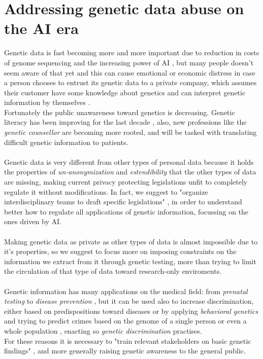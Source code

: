 \documentclass[12pt]{article}
\begin{document}
\section{Addressing genetic data abuse on the AI era}
\label{sec:conclusion}
Genetic data is fast becoming more and more important due to reduction in costs of genome sequencing and the increasing power of AI \cite{economy_genome}, but many people doesn't seem aware of that 
yet and this can cause emotional or economic distress in case a person chooses to entrust its genetic data to a private company, which assumes their customer have some knowledge about 
genetics and can interpret genetic information by themselves \cite{23andme}.\\
Fortunately the public unawareness toward genetics is decreasing. Genetic literacy has been improving for the last decade \cite{genetic_literacy}, also, new professions like the \emph{genetic counsellor} are becoming more rooted, and will be tasked with 
translating difficult genetic information to patients.\\
\\
Genetic data is very different from other types of personal data because it holds the properties of \emph{un-anonymization} \cite{anonymization} and \emph{estendibility} \cite{understanding_genetics} that the 
other types of data are missing, making current privacy protecting legislations unfit to completely regulate it without modifications. In fact, we suggest to "organize interdisciplinary teams to draft specific legislations" \cite{genetic_data_misuse}, 
in order to understand better how to regulate all applications of genetic information, focussing on the ones driven by AI.\\
\\
Making genetic data as private as other types of data is almost impossible due to it's properties, so we suggest to focus more on imposing constraints on the information we extract from it 
through genetic testing, more than trying to limit the circulation of that type of data toward research-only enviroments. \cite{genetic_data_misuse}\\
\\
Genetic information has many applications on the medical field: from \emph{prenatal testing} \cite{prenatal_testing} to \emph{disease prevention} \cite{understanding_genetics}, but it can be used 
also to increase discrimination, either based on predispositions toward diseases \cite{school_kicked_out} or by applying \emph{behavioral genetics} and trying to predict crimes based on the genome of a 
single person \cite{china_collect_dna} or even a whole population \cite{china_collect_dna}, enacting so \emph{genetic discrimination} practises.\\
For these reasons it is necessary to "train relevant stakeholders on basic genetic findings" \cite{genetic_data_misuse}, and more generally raising genetic 
awareness to the general public.\\
\\
\end{document}
